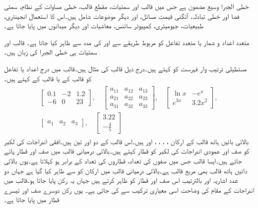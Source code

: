 خطی الجبرا وسیع مضمون ہے جس میں قالب اور سمتیات، مقطع قالب، خطی مساوات کے نظام، سمتی فضا اور  خطی تبادلہ، آئگنی قیمت مسائل، اور دیگر موضوعات شامل ہیں۔اس کا استعمال انجینئری، طبیعیات، جیومیٹری، کمپیوٹر سائنس، معاشیات اور دیگر میدانوں میں پایا جاتا ہے۔

متعدد اعداد و شمار یا متعدد تفاعل کو مربوط طریقے سے  اور  کی مدد سے ظاہر کیا جاتا ہے۔ قالب اور سمتیات ہی خطی الجبرا کی زبان ہیں۔

مستطیلی ترتیب وار فہرست کو  کہتے ہیں۔درج ذیل قالب کی مثال ہیں۔قالب میں درج اعداد یا تفاعل کو قالب کے  یا قالب کے  کہتے ہیں۔ 
\begin{gather}
\begin{aligned}\label{مساوات_قالب_عمومی_قالب_الف}
\begin{bmatrix}
0.1& -2 & 1.2\\
-6 & 0 & 23
\end{bmatrix}, \quad
\begin{bmatrix}
a_{11}& a_{12} & a_{13}\\
a_{21} & a_{22} & a_{23}\\
a_{31} & a_{32} & a_{33}
\end{bmatrix}, \quad
\begin{bmatrix}
\ln x& -e^x\\
e^{3x}& 3.2x^2
\end{bmatrix},\\
\begin{bmatrix}
a_{1} & a_{2} & a_{3}
\end{bmatrix},\quad 
\begin{bmatrix}
3.22\\
-\tfrac{4}{5}
\end{bmatrix}
\end{aligned}
\end{gather}
بالائی بائیں ہاتھ قالب کے ارکان ، ، ، ،  اور  ہیں۔اس قالب کے دو  اور تین  ہیں۔افقی اندراجات کی لکیر کو صف اور عمودی اندراجات کی لکیر کو قطار کہتے ہیں۔بالائی درمیانی قالب میں  صف اور  قطار پائے جاتے ہیں۔ایسا قالب جس میں صفوں کی تعداد، قطاروں کی تعداد کے برابر ہو   کہلاتا ہے۔یوں بالائی دائیں ہاتھ قالب بھی مربع قالب ہے۔بالائی درمیانی قالب میں ارکان کو  سے ظاہر کیا گیا ہے جہاں دو عدد اشاریہ  اور  بالترتیب اس صف اور قطار کو ظاہر کرتے ہیں جہاں یہ رکن پایا جاتا ہو۔قالب میں اندراجات کے مقام کی وضاحت اسی معیاری ترکیب سے کی جاتی ہے۔ یوں  رکن دوسرے صف اور تیسرے قطار میں پایا جاتا ہے۔

